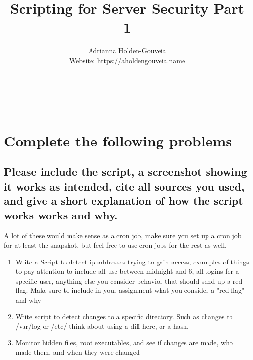 \documentclass[12pt]{article}
\title{Scripting for Server Security Part 1}
\author{
        Adrianna Holden-Gouveia \\
        Website: \url{https://aholdengouveia.name}\\ 
        \date{\vspace{-5ex}}
        \faLinkedin{: aholdengouveia} \\
        \faGithub {: aholdengouveia} \\
        \faTwitter {: aholdengouveia} \\
        }
\begin{document}
    

\maketitle



\section*{Complete the following problems}

\subsection*{Please include the script, a screenshot showing it works as intended, cite all sources you used, and give a short explanation of how the script works works and why.}
A lot of these would make sense as a cron job, make sure you set up a cron job for at least the snapshot, but feel free to use cron jobs for the rest as well.
    \begin{enumerate}
        \item Write a Script to detect ip addresses trying to gain access, examples of things to pay attention to include all use between midnight and 6, all logins for a specific user, anything else you consider behavior that should send up a red flag.  Make sure to include in your assignment what you consider a "red flag" and why
        \item Write script to detect changes to a specific directory.  Such as changes to /var/log or /etc/ think about using a diff here, or a hash.
        \item Monitor hidden files, root executables, and see if changes are made, who made them, and when they were changed
    \end{enumerate}
\end{document}
